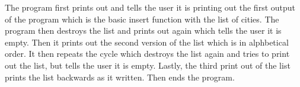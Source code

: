 The program first prints out and tells the user it is printing out the first output of the program which is the basic insert function with the list of cities. The program then destroys the list and prints out again which tells the user it is empty. Then it prints out the second version of the list which is in alphbetical order. It then repeats the cycle which destroys the list again and tries to print out the list, but tells the user it is empty. Lastly, the third print out of the list prints the list backwards as it written. Then ends the program. 